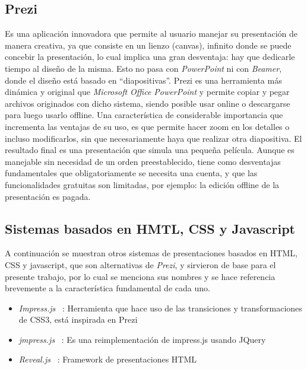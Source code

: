 
		\subsection{Prezi} %
		\label{sub:prezi}

			Es una aplicación innovadora que permite al usuario manejar su presentación de manera creativa, ya que consiste en un lienzo (canvas), infinito donde se puede concebir la presentación, lo cual implica una gran desventaja: hay que dedicarle tiempo al diseño de la misma. Esto no pasa con \textit{PowerPoint} ni con \textit{Beamer}, donde el diseño está basado en ``diapositivas''. Prezi es una herramienta más dinámica y original que \textit{Microsoft Office PowerPoint} y permite copiar y pegar archivos originados con dicho sistema, siendo posible usar online o descargarse para luego usarlo offline.  Una característica de considerable importancia que incrementa las ventajas de su uso, es que permite hacer zoom en los detalles o incluso modificarlos, sin que necesariamente haya que realizar otra diapositiva. El resultado final es una presentación que simula una pequeña película. Aunque es manejable sin necesidad de un orden preestablecido, tiene como desventajas fundamentales que obligatoriamente se necesita una cuenta, y que las funcionalidades gratuitas son limitadas, por ejemplo: la edición offline de la presentación es pagada.



		\subsection{Sistemas basados en HMTL, CSS y Javascript} %
		\label{sub:otros_sistemas}
			A continuación se muestran otros sistemas de presentaciones basados en HTML, CSS y javascript, que son alternativas de \textit{Prezi}, y sirvieron de base para el presente trabajo, por lo cual se menciona sus nombres y se hace referencia brevemente a la característica fundamental de cada uno.
			\begin{itemize}
				\item \textit{Impress.js} ~\cite{impress}: Herramienta que hace uso de las transiciones y transformaciones de CSS3, está inspirada en Prezi
				\item \textit{jmpress.js} ~\cite{jmpress}: Es una reimplementación de impress.js usando JQuery
				\item \textit{Reveal.js} ~\cite{reveal}: Framework de presentaciones HTML
			\end{itemize}
	
